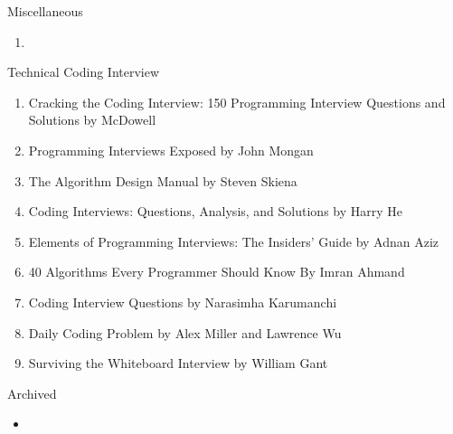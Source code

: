 \documentclass{article}
\begin{document}
\hrulefill

\LARGE Miscellaneous

\normalsize
    \begin{enumerate}
        \item  
    \end{enumerate}

\hrulefill

\LARGE Technical Coding Interview
\normalsize
    \begin{enumerate}
        \item Cracking the Coding Interview: 150 Programming Interview Questions and Solutions by McDowell
        \item Programming Interviews Exposed by John Mongan
        \item The Algorithm Design Manual by Steven Skiena
        \item Coding Interviews: Questions, Analysis, and Solutions by Harry He
        \item Elements of Programming Interviews: The Insiders' Guide by Adnan Aziz
        \item 40 Algorithms Every Programmer Should Know By Imran Ahmand
        \item Coding Interview Questions by Narasimha Karumanchi
        \item Daily Coding Problem by Alex Miller and Lawrence Wu
        \item Surviving the Whiteboard Interview by William Gant
    \end{enumerate}

\hrulefill

\LARGE Archived

\normalsize
    \begin{itemize}
        \item 
    \end{itemize}

    
\end{document}
